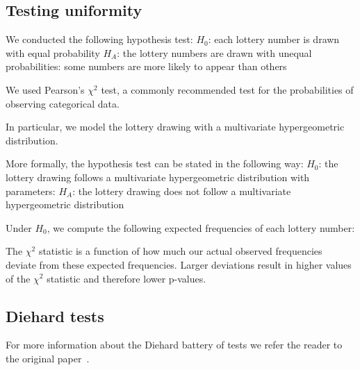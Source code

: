 \subsection{Testing uniformity}

We conducted the following hypothesis test:
$H_0$: each lottery number is drawn with equal probability
$H_A$: the lottery numbers are drawn with unequal probabilities: some numbers are more likely to appear than others

We used Pearson's $\chi^2$ test, a commonly recommended test for the probabilities of observing categorical data. 

In particular, we model the lottery drawing with a multivariate hypergeometric distribution. 

More formally, the hypothesis test can be stated in the following way:
$H_0$: the lottery drawing follows a multivariate hypergeometric distribution with parameters: 
$H_A$: the lottery drawing does not follow a multivariate hypergeometric distribution

Under $H_0$, we compute the following expected frequencies of each lottery number: 

The $\chi^2$ statistic is a function of how much our actual observed frequencies deviate from these expected frequencies. 
Larger deviations result in higher values of the $\chi^2$ statistic and therefore lower p-values.




\subsection{Diehard tests}

For more information about the Diehard battery of tests we refer the reader to the original paper~\cite{currentRNG}.
